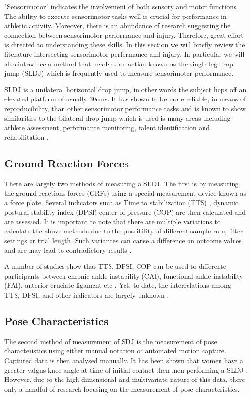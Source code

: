 
"Sensorimotor" indicates the involvement of both sensory and motor functions. The ability to execute sensorimotor tasks well is crucial for performance in athletic activity. Moreover, there is an abundance of research suggesting the connection between sensorimotor performance and injury. Therefore, great effort is directed to understanding these skills. In this section we will briefly review the literature intersecting sensorimotor performance and injury. In particular we will also introduce a method that involves an action known as the single leg drop jump (SLDJ) which is frequently used to measure sensorimotor performance. 

SLDJ is a unilateral horizontal drop jump, in other words the subject hops off an elevated platform of usually 30cms. It has shown to be more reliable, in means of reproducibility, than other sensorimotor performance tasks and is known to show similarities to the bilateral drop jump which is used is many areas including athlete assessment, performance monitoring, talent identification and rehabilitation \cite{Stalbom2007ReliabilityReport}.

\subsection{Ground Reaction Forces}

There are largely two methods of measuring a SLDJ. The first is by measuring the ground reactions forces (GRFs) using a special measurement device known as a force plate. Several indicators such as Time to stabilization (TTS) \cite{Fransz2014HowTask}, dynamic postural stability index (DPSI) \cite{Huurnink2019TheStudy} center of pressure (COP) \cite{Fransz2014HowTask} are then calculated and are assessed. It is important to note that there are multiple variations to calculate the above methods due to the possibility of different sample rate, filter settings or trial length. Such variances can cause a difference on outcome values and are may lead to contradictory results \cite{Fransz2015TimeValues}. 

A number of studies show that TTS, DPSI, COP can be used to differente participants between chronic ankle instability (CAI), functional ankle instability (FAI), anterior cruciate ligament etc \cite{WIKSTROM2005DetectionInstability}. Yet, to date, the interrelations among TTS, DPSI, and other indicators are largely unknown \cite{Huurnink2019TheStudy}.

\subsection{Pose Characteristics}
The second method of measurement of SDJ is the measurement of pose characteristics using either manual notation or automated motion capture. Captured data is then analysed manually. 
It has been shown that women have a greater valgus knee angle at time of initial contact then men performing a SLDJ \cite{Russell2006SexJump}. However, due to the high-dimensional and multivariate nature of this data, there only a handful of research focusing on the measurement of pose characteristics. 

